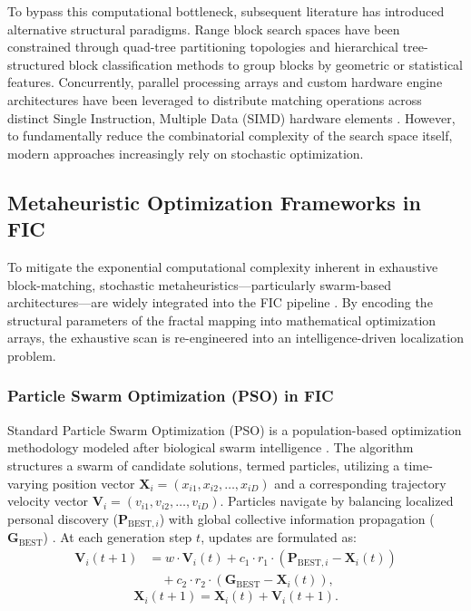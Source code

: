 \documentclass[conference]{IEEEtran}
\begin{document}
To bypass this computational bottleneck, subsequent literature has introduced alternative structural paradigms. Range block search spaces have been constrained through quad-tree partitioning topologies \cite{compression1995fractal} and hierarchical tree-structured block classification methods \cite{478245, hurtgen1993fast} to group blocks by geometric or statistical features. Concurrently, parallel processing arrays and custom hardware engine architectures have been leveraged to distribute matching operations across distinct Single Instruction, Multiple Data (SIMD) hardware elements \cite{hufnagl2000algorithms, vidya2000architecture}. However, to fundamentally reduce the combinatorial complexity of the search space itself, modern approaches increasingly rely on stochastic optimization.

\subsection{Metaheuristic Optimization Frameworks in FIC}
To mitigate the exponential computational complexity inherent in exhaustive block-matching, stochastic metaheuristics—particularly swarm-based architectures—are widely integrated into the FIC pipeline \cite{241507, PSOFIC}. By encoding the structural parameters of the fractal mapping into mathematical optimization arrays, the exhaustive scan is re-engineered into an intelligence-driven localization problem.

\subsubsection{Particle Swarm Optimization (PSO) in FIC}
Standard Particle Swarm Optimization (PSO) is a population-based optimization methodology modeled after biological swarm intelligence \cite{PSOOriginal, eberhart1995new}. The algorithm structures a swarm of candidate solutions, termed particles, utilizing a time-varying position vector $\mathbf{X}_i = (x_{i1}, x_{i2}, \dots, x_{iD})$ and a corresponding trajectory velocity vector $\mathbf{V}_i = (v_{i1}, v_{i2}, \dots, v_{iD})$. Particles navigate by balancing localized personal discovery ($\mathbf{P}_{\text{BEST}, i}$) with global collective information propagation ($\mathbf{G}_{\text{BEST}}$) \cite{PSOOriginal}. At each generation step $t$, updates are formulated as:
\begin{equation}
\begin{split}
\mathbf{V}_i(t+1) &= w \cdot \mathbf{V}_i(t) + c_1 \cdot r_1 \cdot (\mathbf{P}_{\text{BEST}, i} - \mathbf{X}_i(t)) \\
&\quad + c_2 \cdot r_2 \cdot (\mathbf{G}_{\text{BEST}} - \mathbf{X}_i(t)),
\end{split}
\end{equation}
\begin{equation}
\mathbf{X}_i(t+1) = \mathbf{X}_i(t) + \mathbf{V}_i(t+1).
\end{equation}
\end{document}
